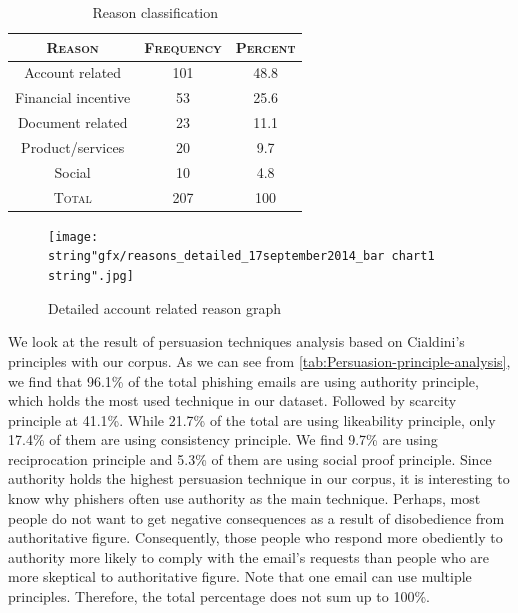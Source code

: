 \begin{table}[h]
\centering{}%
\begin{tabular}{ccc}
\toprule 
\textsc{\small{}Reason} & \textsc{\small{}Frequency} & \textsc{\small{}Percent}\tabularnewline
\midrule
\midrule 
{\small{}Account related} & {\small{}101} & 48.8\tabularnewline
\midrule 
{\small{}Financial incentive} & {\small{}53} & 25.6\tabularnewline
\midrule 
{\small{}Document related} & {\small{}23} & {\small{}11.1}\tabularnewline
\midrule 
Product/services & 20 & 9.7\tabularnewline
\midrule 
Social  & 10 & 4.8\tabularnewline
\midrule
\midrule 
\textsc{\small{}Total} & 207 & 100\tabularnewline
\bottomrule
\end{tabular}\protect\caption{\label{tab:Reason-classification}Reason classification}
\end{table}


\begin{figure}[h]
%


%
\begin{centering}
\texttt{[image: \\string"gfx/reasons\_detailed\_17september2014\_bar chart1\\string".jpg]}\protect\caption{\label{fig:Detailed-account-related}Detailed account related reason
graph}

\par\end{centering}

%
%
\end{figure}


We look at the result of persuasion techniques analysis based on Cialdini's
principles with our corpus. As we can see from \autoref{tab:Persuasion-principle-analysis},
we find that 96.1\% of the total phishing emails are using authority
principle, which holds the most used technique in our dataset. Followed
by scarcity principle at 41.1\%. While 21.7\% of the total are using
likeability principle, only 17.4\% of them are using consistency principle.
We find 9.7\% are using reciprocation principle and 5.3\% of them
are using social proof principle. Since authority holds the highest
persuasion technique in our corpus, it is interesting to know why
phishers often use authority as the main technique. Perhaps, most
people do not want to get negative consequences as a result of disobedience
from authoritative figure. Consequently, those people who respond
more obediently to authority more likely to comply with the email's
requests than people who are more skeptical to authoritative figure.
Note that one email can use multiple principles. Therefore, the total
percentage does not sum up to 100\%.

